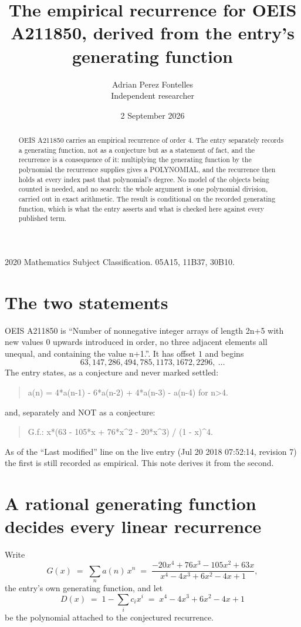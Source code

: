 \documentclass[11pt,a4paper]{article}
\title{The empirical recurrence for OEIS A211850, derived from the entry's generating function}
\author{Adrian Perez Fontelles\\ \small Independent researcher}
\date{2 September 2026}
\theoremstyle{plain}
\theoremstyle{definition}
\begin{document}
\maketitle

\begin{abstract}
OEIS A211850 carries an empirical recurrence of order $4$. The entry separately records a
generating function, not as a conjecture but as a statement of fact, and the recurrence is a
consequence of it: multiplying the generating function by the polynomial the recurrence
supplies gives a POLYNOMIAL, and the recurrence then holds at every index past that
polynomial's degree. No model of the objects being counted is needed, and no search: the
whole argument is one polynomial division, carried out in exact arithmetic. The result is
conditional on the recorded generating function, which is what the entry asserts and what is
checked here against every published term.
\end{abstract}

\noindent\small 2020 Mathematics Subject Classification. 05A15, 11B37, 30B10.\normalsize

\section{The two statements}

OEIS A211850 is ``Number of nonnegative integer arrays of length 2n+5 with new values 0 upwards introduced in order, no three adjacent elements all unequal, and containing the value n+1.''. It has offset $1$ and begins
\[
63, 147, 286, 494, 785, 1173, 1672, 2296,\ \dots
\]
The entry states, as a conjecture and never marked settled:
\begin{quote}
a(n) = 4*a(n-1) - 6*a(n-2) + 4*a(n-3) - a(n-4) for n>4.
\end{quote}
and, separately and NOT as a conjecture:
\begin{quote}
G.f.: x*(63 - 105*x + 76*x\^{}2 - 20*x\^{}3) / (1 - x)\^{}4.
\end{quote}
As of the ``Last modified'' line on the live entry (Jul 20 2018 07:52:14, revision 7) the first is still
recorded as empirical. This note derives it from the second.

\section{A rational generating function decides every linear recurrence}

Write
\[
G(x)\;=\;\sum_{n}a(n)\,x^{n}\;=\;\frac{- 20 x^{4} + 76 x^{3} - 105 x^{2} + 63 x}{x^{4} - 4 x^{3} + 6 x^{2} - 4 x + 1},
\]
the entry's own generating function, and let
\[
D(x)\;=\;1-\sum_i c_i x^{i}\;=\;x^{4} - 4 x^{3} + 6 x^{2} - 4 x + 1
\]
be the polynomial attached to the conjectured recurrence.
\end{document}
